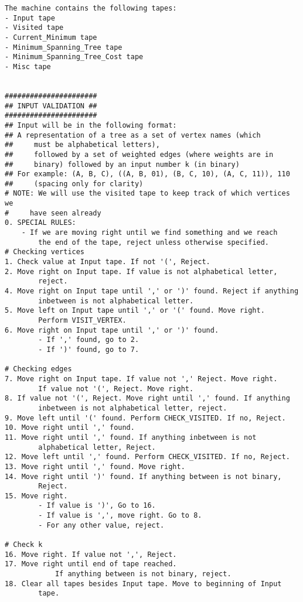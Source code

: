 \documentclass{article}
\begin{document}
\begin{lstlisting}[frame=single]
The machine contains the following tapes:
- Input tape
- Visited tape 
- Current_Minimum tape
- Minimum_Spanning_Tree tape
- Minimum_Spanning_Tree_Cost tape
- Misc tape
 
 
######################
## INPUT VALIDATION ##
######################
## Input will be in the following format:
## A representation of a tree as a set of vertex names (which 
##     must be alphabetical letters), 
##     followed by a set of weighted edges (where weights are in 
##     binary) followed by an input number k (in binary)
## For example: (A, B, C), ((A, B, 01), (B, C, 10), (A, C, 11)), 110
##     (spacing only for clarity)
# NOTE: We will use the visited tape to keep track of which vertices we
#     have seen already
0. SPECIAL RULES:
    - If we are moving right until we find something and we reach
        the end of the tape, reject unless otherwise specified.
# Checking vertices
1. Check value at Input tape. If not '(', Reject.
2. Move right on Input tape. If value is not alphabetical letter, 
        reject.
4. Move right on Input tape until ',' or ')' found. Reject if anything
        inbetween is not alphabetical letter.
5. Move left on Input tape until ',' or '(' found. Move right. 
        Perform VISIT_VERTEX.
6. Move right on Input tape until ',' or ')' found.
        - If ',' found, go to 2.
        - If ')' found, go to 7.

# Checking edges
7. Move right on Input tape. If value not ',' Reject. Move right. 
        If value not '(', Reject. Move right.
8. If value not '(', Reject. Move right until ',' found. If anything
        inbetween is not alphabetical letter, reject.
9. Move left until '(' found. Perform CHECK_VISITED. If no, Reject.
10. Move right until ',' found.
11. Move right until ',' found. If anything inbetween is not 
        alphabetical letter, Reject.
12. Move left until ',' found. Perform CHECK_VISITED. If no, Reject.
13. Move right until ',' found. Move right.
14. Move right until ')' found. If anything between is not binary, 
        Reject.
15. Move right. 
        - If value is ')', Go to 16.
        - If value is ',', move right. Go to 8.
        - For any other value, reject.

# Check k
16. Move right. If value not ',', Reject.
17. Move right until end of tape reached. 
            If anything between is not binary, reject.
18. Clear all tapes besides Input tape. Move to beginning of Input 
        tape.



\end{lstlisting}
\end{document}
